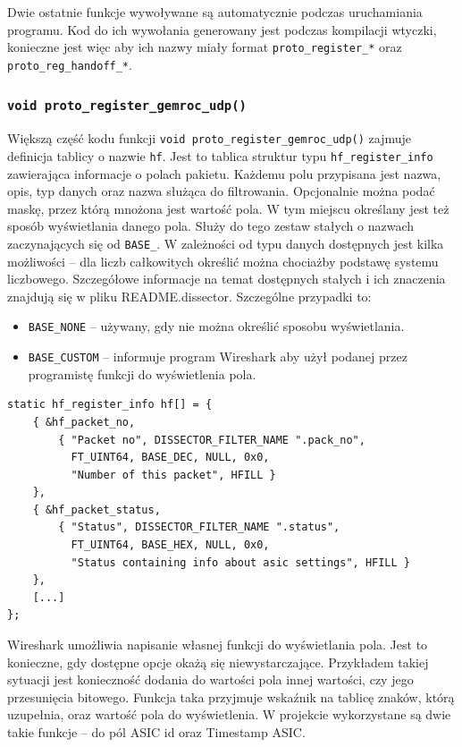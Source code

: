 \documentclass[a4paper, 12pt, twoside, openright]{article}
\begin{document}
Dwie ostatnie funkcje wywoływane są automatycznie podczas uruchamiania programu. Kod do ich wywołania generowany jest
podczas kompilacji wtyczki, konieczne jest więc aby ich nazwy miały format \texttt{proto\_register\_*} oraz
\texttt{proto\_reg\_handoff\_*}.

\subsubsection{\texttt{void proto\_register\_gemroc\_udp()}}

\indent\par
Większą część kodu funkcji \texttt{void proto\_register\_gemroc\_udp()} zajmuje definicja tablicy o nazwie \texttt{hf}.
Jest to tablica struktur typu \texttt{hf\_register\_info} zawierająca informacje o polach pakietu. Każdemu polu przypisana
jest nazwa, opis, typ danych oraz nazwa służąca do filtrowania. Opcjonalnie można podać maskę, przez którą mnożona jest
wartość pola. W tym miejscu określany jest też sposób wyświetlania danego pola. Służy do tego zestaw stałych o nazwach
zaczynających się od \texttt{BASE\_}. W zależności od typu danych dostępnych jest kilka możliwości -- dla liczb całkowitych
określić można chociażby podstawę systemu liczbowego. Szczegółowe informacje na temat dostępnych stałych i ich znaczenia
znajdują się w pliku README.dissector. Szczególne przypadki to:
\begin{itemize}
	\item \texttt{BASE\_NONE} -- używany, gdy nie można określić sposobu wyświetlania.
	\item \texttt{BASE\_CUSTOM} -- informuje program Wireshark aby użył podanej przez programistę funkcji do wyświetlenia pola.
\end{itemize}

\begin{lstlisting}[style=CStyle]
static hf_register_info hf[] = {
	{ &hf_packet_no,
		{ "Packet no", DISSECTOR_FILTER_NAME ".pack_no",
		  FT_UINT64, BASE_DEC, NULL, 0x0,
		  "Number of this packet", HFILL }
	},
	{ &hf_packet_status,
		{ "Status", DISSECTOR_FILTER_NAME ".status",
		  FT_UINT64, BASE_HEX, NULL, 0x0,
		  "Status containing info about asic settings", HFILL }
	},
	[...]
};

\end{lstlisting}

Wireshark umożliwia napisanie własnej funkcji do wyświetlania pola. Jest to konieczne, gdy dostępne opcje okażą się niewystarczające.
Przykładem takiej sytuacji jest konieczność dodania do wartości pola innej wartości, czy jego przesunięcia bitowego.
Funkcja taka przyjmuje wskaźnik na tablicę znaków, którą uzupełnia, oraz wartość pola do wyświetlenia. W projekcie wykorzystane
są dwie takie funkcje -- do pól ASIC id oraz Timestamp ASIC.
\end{document}
